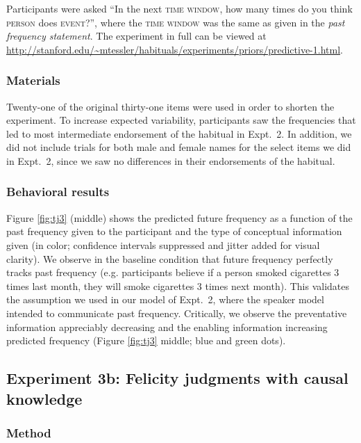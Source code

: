 \documentclass[10pt,letterpaper]{article}
\begin{document}
Participants were asked ``In the next \textsc{time window}, how many times do you think \textsc{person} does \textsc{event}?'', where the \textsc{time window} was the same as given in the \emph{past frequency statement}.
The experiment in full can be viewed at \url{http://stanford.edu/~mtessler/habituals/experiments/priors/predictive-1.html}.

\subsubsection{Materials}

Twenty-one of the original thirty-one items were used in order to shorten the experiment.
To increase expected variability, participants saw the frequencies that led to most intermediate endorsement of the habitual in Expt.~2. 
In addition, we did not include trials for both male and female names for the select items we did in Expt.~2, since we saw no differences in their endorsements of the habitual.

\subsubsection{Behavioral results}

Figure \ref{fig:tj3} (middle) shows the predicted future frequency as a function of the past frequency given to the participant and the type of conceptual information given (in color; confidence intervals suppressed and jitter added for visual clarity). 
We observe in the baseline condition that future frequency perfectly tracks past frequency (e.g. participants believe if a person smoked cigarettes 3 times last month, they will smoke cigarettes 3 times next month). 
This validates the assumption we used in our model of Expt.~2, where the speaker model intended to communicate past frequency.
Critically, we observe the preventative information appreciably decreasing and the enabling information increasing predicted frequency (Figure \ref{fig:tj3} middle; blue and green dots).




\subsection{Experiment 3b: Felicity judgments with causal knowledge}


\subsubsection{Method}
\end{document}
